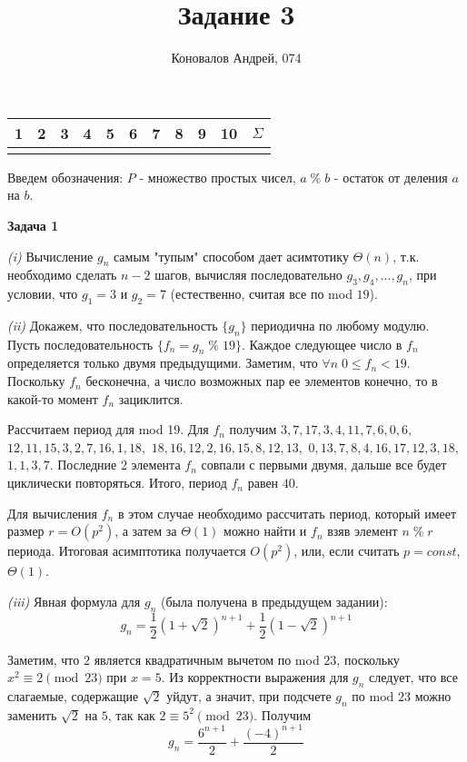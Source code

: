 \documentclass[10pt]{article}
\title{Задание 3}
\author{Коновалов Андрей, 074}
\date{}
\begin{document}
\maketitle

\noindent
\begin{tabularx}{\textwidth}{|C|C|C|C|C|C|C|C|C|C|C|}
   & 2 & 3 & 4 & 5 & 6 & 7 & 8 & 9 & 10 & $\Sigma$ \\
  \hline
  &&&&&&&&&& \\
  \hline
\end{tabularx}

\bigskip

Введем обозначения: $P$ - множество простых чисел, $a \; \% \; b$ - остаток от деления $a$ на $b$.

\medskip

{\bf Задача 1}

{\it (i)}
Вычисление $g_n$ самым "тупым" способом дает асимтотику $\Theta(n)$, т.к. необходимо сделать $n - 2$ шагов, вычисляя последовательно $g_3, g_4, ..., g_n$, при условии, что $g_1 = 3$ и $g_2 = 7$ (естественно, считая все по mod $19$).

\smallskip

{\it (ii)}
Докажем, что последовательность $\{ g_n \}$ периодична по любому модулю.
Пусть последовательность $\{ f_n = g_n \; \% \; 19 \}$.
Каждое следующее число в $f_n$ определяется только двумя предыдущими.
Заметим, что $\forall n \; 0 \leq f_n < 19$.
Поскольку $f_n$ бесконечна, а число возможных пар ее элементов конечно, то в какой-то момент $f_n$ зациклится.

Рассчитаем период для mod 19. Для $f_n$ получим
$3, 7, 17, 3, 4, 11, 7, 6, 0, 6,$
$12, 11, 15, 3, 2, 7, 16, 1, 18,$
$18, 16, 12, 2, 16, 15, 8, 12, 13,$
$0, 13, 7, 8, 4, 16, 17, 12, 3, 18,$
$1, 1, 3, 7$.
Последние 2 элемента $f_n$ совпали с первыми двумя, дальше все будет циклически повторяться.
Итого, период $f_n$ равен $40$.

Для вычисления $f_n$ в этом случае необходимо рассчитать период, который имеет размер $r = O(p^2)$, а затем за $\Theta(1)$ можно найти и $f_n$ взяв элемент $n \; \% \; r$ периода.
Итоговая асимптотика получается $O(p^2)$, или, если считать $p = const$, $\Theta(1)$.

\smallskip

{\it (iii)}
Явная формула для $g_n$ (была получена в предыдущем задании):
$$
  g_n = \frac{1}{2} \left( 1 + \sqrt{2} \right)^{n + 1} + \frac{1}{2} \left( 1 - \sqrt{2} \right)^{n + 1}
$$

Заметим, что $2$ является квадратичным вычетом по mod $23$, поскольку $x^2 \equiv 2 \pmod{23}$ при $x = 5$.
Из корректности выражения для $g_n$ следует, что все слагаемые, содержащие $\sqrt{2}$ уйдут, а значит, при подсчете $g_n$ по mod $23$ можно заменить $\sqrt{2}$ на $5$, так как $2 \equiv 5^2 \pmod{23}$.
Получим
$$
  g_n = \frac{6^{n + 1}}{2} + \frac{(-4)^{n + 1}}{2}
$$
\end{document}
